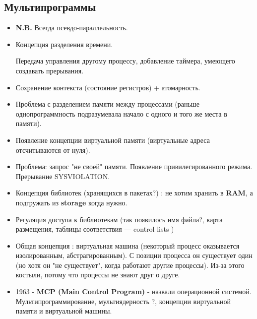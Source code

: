 \documentclass[12pt, a4paper]{report}
\begin{document}
\subsection{Мультипрограммы}
\begin{itemize}
    \item \textbf{N.B.} Всегда псевдо-параллельность.

    \item Концепция разделения времени. 
        
          Передача управления другому процессу, добавление таймера, умеющего создавать прерывания.

    \item Сохранение контекста (состояние регистров) + атомарность.

    \item Проблема с разделением памяти между процессами (раньше однопрограммность подразумевала начало с одного и того же места в памяти).

    \item Появление концепции виртуальной памяти (виртуальные адреса отсчитываются от нуля).

    \item Проблема: запрос "не своей" памяти. Появление привилегированного режима. Прерывание SYSVIOLATION.

    \item Концепция библиотек (хранящихся в пакетах?) : не хотим хранить в \textbf{RAM}, а подгружать из \textbf{storage} когда нужно.

    \item Регуляция доступа к библиотекам (так появилось имя файла?, карта размещения, таблицы соответствия --- control lists )

    \item Общая концепция : виртуальная машина (некоторый процесс оказывается изолированным, абстрагированным). С позиции процесса он существует один (но хотя он "не существует", когда работают другие процессы). Из-за этого костыли, потому что процессы не знают друг о друге.

    \item 1963 - \textbf{MCP (Main Control Program)} - назвали операционной системой. Мультипрограммирование, мультиядерность ?, концепции виртуальной памяти и виртуальной машины.
\end{itemize}
\end{document}
